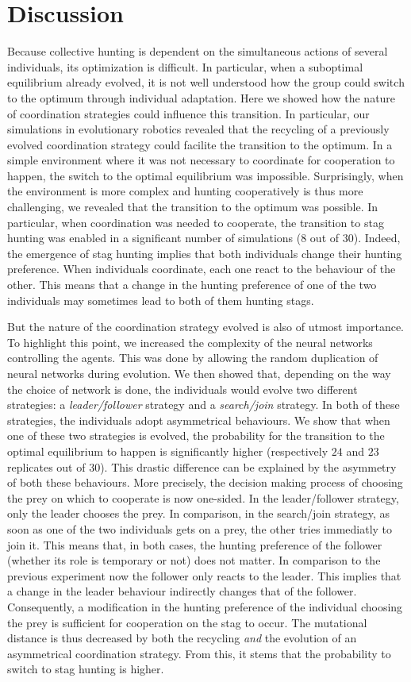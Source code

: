  \section{Discussion}
    Because collective hunting is dependent on the simultaneous actions of several individuals, its optimization is difficult. In particular, when a suboptimal equilibrium already evolved, it is not well understood how the group could switch to the optimum through individual adaptation. Here we showed how the nature of coordination strategies could influence this transition. In particular, our simulations in evolutionary robotics revealed that the recycling of a previously evolved coordination strategy could facilite the transition to the optimum. In a simple environment where it was not necessary to coordinate for cooperation to happen, the switch to the optimal equilibrium was impossible. Surprisingly, when the environment is more complex and hunting cooperatively is thus more challenging, we revealed that the transition to the optimum was possible. In particular, when coordination was needed to cooperate, the transition to stag hunting was enabled in a significant number of simulations ($8$ out of $30$). Indeed, the emergence of stag hunting implies that both individuals change their hunting preference. When individuals coordinate, each one react to the behaviour of the other. This means that a change in the hunting preference of one of the two individuals may sometimes lead to both of them hunting stags.

    But the nature of the coordination strategy evolved is also of utmost importance. To highlight this point, we increased the complexity of the neural networks controlling the agents. This was done by allowing the random duplication of neural networks during evolution. We then showed that, depending on the way the choice of network is done, the individuals would evolve two different strategies: a \emph{leader/follower} strategy and a \emph{search/join} strategy. In both of these strategies, the individuals adopt asymmetrical behaviours. We show that when one of these two strategies is evolved, the probability for the transition to the optimal equilibrium to happen is significantly higher (respectively $24$ and $23$ replicates out of $30$). This drastic difference can be explained by the asymmetry of both these behaviours. More precisely, the decision making process of choosing the prey on which to cooperate is now one-sided. In the leader/follower strategy, only the leader chooses the prey. In comparison, in the search/join strategy, as soon as one of the two individuals gets on a prey, the other tries immediatly to join it. This means that, in both cases, the hunting preference of the follower (whether its role is temporary or not) does not matter. In comparison to the previous experiment now the follower only reacts to the leader. This implies that a change in the leader behaviour indirectly changes that of the follower. Consequently, a modification in the hunting preference of the individual choosing the prey is sufficient for cooperation on the stag to occur. The mutational distance is thus decreased by both the recycling \emph{and} the evolution of an asymmetrical coordination strategy. From this, it stems that the probability to switch to stag hunting is higher. 

